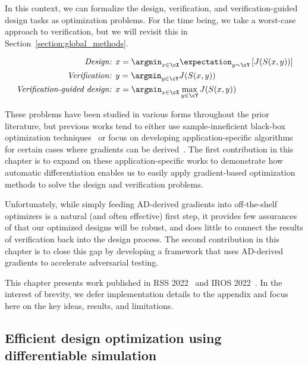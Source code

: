 In this context, we can formalize the design, verification, and verification-guided design tasks as optimization problems. For the time being, we take a worst-case approach to verification, but we will revisit this in Section~\ref{section:global_methods}.

\begin{align}
    \textit{Design: }                     & x = \argmin_{x \in \cX} \expectation_{y \sim \cY}\left[ J(S(x, y)) \right] \label{ch5:eq:design}     \\
    \textit{Verification: }               & y = \argmin_{y \in \cY} J(S(x, y))    \label{ch5:eq:verification}                                    \\
    \textit{Verification-guided design: } & x = \argmin_{x \in \cX} \max_{y \in \cY} J(S(x, y)) \label{ch5:eq:verification_guided_design_minmax}
\end{align}

These problems have been studied in various forms throughout the prior literature, but previous works tend to either use sample-inneficient black-box optimization techniques~\cite{corsoAdaptiveStressTesting2019,corsoSurveyAlgorithmsBlackBox2021,dingLearningCollideAdaptive2020a,wangAdvSimGeneratingSafetyCritical2021a} or focus on developing application-specific algorithms for certain cases where gradients can be derived~\cite{Schulz_robogami,du2016computational,du2021underwater,ma2021diffaqua,xu_uav_controllers}. The first contribution in this chapter is to expand on these application-specific works to demonstrate how automatic differentiation enables us to easily apply gradient-based optimization methods to solve the design and verification problems.

Unfortunately, while simply feeding AD-derived gradients into off-the-shelf optimizers is a natural (and often effective) first step, it provides few assurances of that our optimized designs will be robust, and does little to connect the results of verification back into the design process. The second contribution in this chapter is to close this gap by developing a framework that uses AD-derived gradients to accelerate adversarial testing.

This chapter presents work published in RSS 2022~\cite{dawsonCertifiableRobotDesign2022} and IROS 2022~\cite{dawsonRobustCounterexampleguidedOptimization2022}. In the interest of brevity, we defer implementation details to the appendix and focus here on the key ideas, results, and limitations.

\subsection{Efficient design optimization using differentiable simulation}

